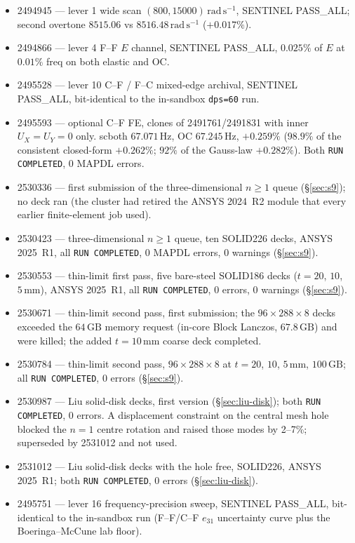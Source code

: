 \documentclass[11pt]{article}
\begin{document}
\begin{itemize}
      $(800,4000)\,\mathrm{rad\,s^{-1}}$ ($+0.137\%$ split). Pre-registered
      bar of two overtones in that window not met.
\item 2494945 --- lever 1 wide scan $(800,15000)\,\mathrm{rad\,s^{-1}}$,
      SENTINEL PASS\_ALL; second overtone $8515.06$ vs
      $8516.48\,\mathrm{rad\,s^{-1}}$ ($+0.017\%$).
\item 2494866 --- lever 4 F--F $E$ channel, SENTINEL PASS\_ALL,
      $0.025\%$ of $E$ at $0.01\%$ freq on both elastic and OC.
\item 2495528 --- lever 10 C--F / F--C mixed-edge archival,
      SENTINEL PASS\_ALL, bit-identical to the in-sandbox
      \texttt{dps=60} run.
\item 2495593 --- optional C--F FE, clones of 2491761/2491831 with
      inner $U_X=U_Y=0$ only. scboth $67.071\,\mathrm{Hz}$, OC
      $67.245\,\mathrm{Hz}$, $+0.259\%$ ($98.9\%$ of the consistent
      closed-form $+0.262\%$; $92\%$ of the Gauss-law $+0.282\%$). Both \texttt{RUN COMPLETED}, 0 MAPDL errors.
\item 2530336 --- first submission of the three-dimensional $n\ge1$
      queue (\S\ref{sec:s9}); no deck ran (the cluster had retired the
      ANSYS 2024~R2 module that every earlier finite-element job used).
\item 2530423 --- three-dimensional $n\ge1$ queue, ten SOLID226 decks,
      ANSYS 2025~R1, all \texttt{RUN COMPLETED}, 0 MAPDL errors, 0
      warnings (\S\ref{sec:s9}).
\item 2530553 --- thin-limit first pass, five bare-steel SOLID186 decks
      ($t=20$, $10$, $5\,\mathrm{mm}$), ANSYS 2025~R1, all
      \texttt{RUN COMPLETED}, 0 errors, 0 warnings (\S\ref{sec:s9}).
\item 2530671 --- thin-limit second pass, first submission; the
      $96\times288\times8$ decks exceeded the $64\,\mathrm{GB}$ memory
      request (in-core Block Lanczos, $67.8\,\mathrm{GB}$) and were killed;
      the added $t=10\,\mathrm{mm}$ coarse deck completed.
\item 2530784 --- thin-limit second pass, $96\times288\times8$ at $t=20$,
      $10$, $5\,\mathrm{mm}$, $100\,\mathrm{GB}$; all \texttt{RUN
      COMPLETED}, 0 errors (\S\ref{sec:s9}).
\item 2530987 --- Liu solid-disk decks, first version
      (\S\ref{sec:liu-disk}); both \texttt{RUN COMPLETED}, 0 errors. A
      displacement constraint on the central mesh hole blocked the $n=1$
      centre rotation and raised those modes by 2--7\%; superseded by
      2531012 and not used.
\item 2531012 --- Liu solid-disk decks with the hole free, SOLID226,
      ANSYS 2025~R1; both \texttt{RUN COMPLETED}, 0 errors
      (\S\ref{sec:liu-disk}).
\item 2495751 --- lever 16 frequency-precision sweep, SENTINEL
      PASS\_ALL, bit-identical to the in-sandbox run (F--F/C--F
      $e_{31}$ uncertainty curve plus the Boeringa--McCune lab
      floor).
\end{itemize}
\end{document}

